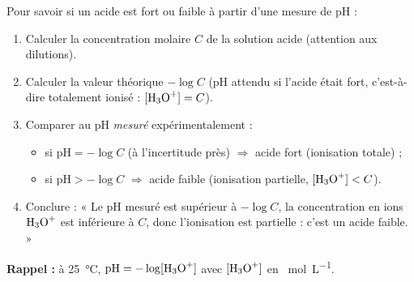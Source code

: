 \documentclass[11pt]{article}
\newcommand{\cle}[1]{{\popxbold\color{popdark}#1}}
\begin{document}
\begin{methode}
Pour savoir si un acide est fort ou faible à partir d'une mesure de pH :
\begin{enumerate}
\item Calculer la concentration molaire $C$ de la solution acide (attention aux dilutions).
\item Calculer la valeur théorique $-\log C$ (pH attendu si l'acide était fort, c'est-à-dire totalement ionisé : $[\ce{H3O+}] = C$).
\item Comparer au pH \emph{mesuré} expérimentalement :
\begin{itemize}
\item si $\mathrm{pH} = -\log C$ (à l'incertitude près) $\Rightarrow$ acide \cle{fort} (ionisation totale) ;
\item si $\mathrm{pH} > -\log C$ $\Rightarrow$ acide \cle{faible} (ionisation partielle, $[\ce{H3O+}] < C$).
\end{itemize}
\item Conclure : « Le pH mesuré est supérieur à $-\log C$, la concentration en ions $\ce{H3O+}$ est inférieure à $C$, donc l'ionisation est partielle : c'est un acide faible. »
\end{enumerate}
\textbf{Rappel :} à \SI{25}{\celsius}, $\mathrm{pH} = -\log[\ce{H3O+}]$ avec $[\ce{H3O+}]$ en \SI{}{mol.L^{-1}}.
\end{methode}
\end{document}
